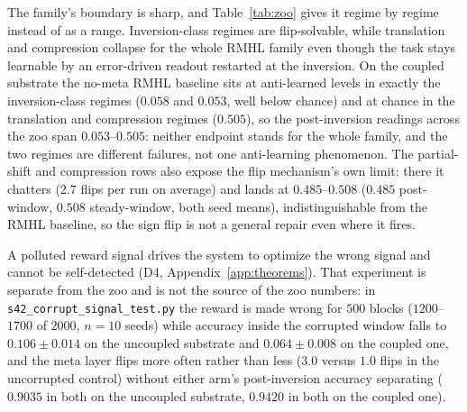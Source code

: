 \documentclass[preprint,12pt]{elsarticle}
\begin{document}
The family's boundary is sharp, and Table~\ref{tab:zoo} gives it regime by
regime instead of as a range. Inversion-class regimes are flip-solvable, while
translation and compression collapse for the whole RMHL family even though the
task stays learnable by an error-driven readout restarted at the inversion. On
the coupled substrate the no-meta RMHL baseline sits at anti-learned levels in
exactly the inversion-class regimes ($0.058$ and $0.053$, well below chance)
and at chance in the translation and compression regimes ($0.505$), so the
post-inversion readings across the zoo span $0.053$--$0.505$: neither endpoint
stands for the whole family, and the two regimes are different failures, not
one anti-learning phenomenon. The partial-shift and compression rows also
expose the flip mechanism's own limit: there it chatters ($2.7$ flips per
run on average) and lands at $0.485$--$0.508$ ($0.485$ post-window,
$0.508$ steady-window, both seed means), indistinguishable from the RMHL
baseline, so the sign flip is not a general repair even where it fires.

A polluted reward signal drives the system to optimize the wrong signal and
cannot be self-detected (D4, Appendix~\ref{app:theorems}). That experiment is
separate from the zoo and is not the source of the zoo numbers: in
\texttt{s42\_corrupt\_signal\_test.py} the reward is made wrong for $500$
blocks ($1200$--$1700$ of $2000$, $n=10$ seeds) while accuracy inside the
corrupted window falls to $0.106\pm0.014$ on the uncoupled substrate and
$0.064\pm0.008$ on the coupled one, and the meta layer flips more often rather
than less ($3.0$ versus $1.0$ flips in the uncorrupted control) without either
arm's post-inversion accuracy separating ($0.9035$ in both on the uncoupled
substrate, $0.9420$ in both on the coupled one).
\end{document}
